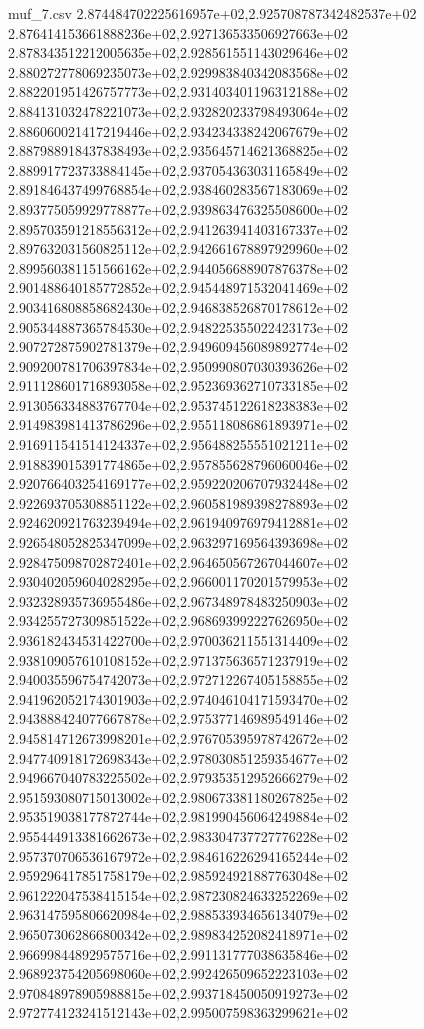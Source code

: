 \begin{filecontents*}{muf_7.csv}
2.874484702225616957e+02,2.925708787342482537e+02
2.876414153661888236e+02,2.927136533506927663e+02
2.878343512212005635e+02,2.928561551143029646e+02
2.880272778069235073e+02,2.929983840342083568e+02
2.882201951426757773e+02,2.931403401196312188e+02
2.884131032478221073e+02,2.932820233798493064e+02
2.886060021417219446e+02,2.934234338242067679e+02
2.887988918437838493e+02,2.935645714621368825e+02
2.889917723733884145e+02,2.937054363031165849e+02
2.891846437499768854e+02,2.938460283567183069e+02
2.893775059929778877e+02,2.939863476325508600e+02
2.895703591218556312e+02,2.941263941403167337e+02
2.897632031560825112e+02,2.942661678897929960e+02
2.899560381151566162e+02,2.944056688907876378e+02
2.901488640185772852e+02,2.945448971532041469e+02
2.903416808858682430e+02,2.946838526870178612e+02
2.905344887365784530e+02,2.948225355022423173e+02
2.907272875902781379e+02,2.949609456089892774e+02
2.909200781706397834e+02,2.950990807030393626e+02
2.911128601716893058e+02,2.952369362710733185e+02
2.913056334883767704e+02,2.953745122618238383e+02
2.914983981413786296e+02,2.955118086861893971e+02
2.916911541514124337e+02,2.956488255551021211e+02
2.918839015391774865e+02,2.957855628796060046e+02
2.920766403254169177e+02,2.959220206707932448e+02
2.922693705308851122e+02,2.960581989398278893e+02
2.924620921763239494e+02,2.961940976979412881e+02
2.926548052825347099e+02,2.963297169564393698e+02
2.928475098702872401e+02,2.964650567267044607e+02
2.930402059604028295e+02,2.966001170201579953e+02
2.932328935736955486e+02,2.967348978483250903e+02
2.934255727309851522e+02,2.968693992227626950e+02
2.936182434531422700e+02,2.970036211551314409e+02
2.938109057610108152e+02,2.971375636571237919e+02
2.940035596754742073e+02,2.972712267405158855e+02
2.941962052174301903e+02,2.974046104171593470e+02
2.943888424077667878e+02,2.975377146989549146e+02
2.945814712673998201e+02,2.976705395978742672e+02
2.947740918172698343e+02,2.978030851259354677e+02
2.949667040783225502e+02,2.979353512952666279e+02
2.951593080715013002e+02,2.980673381180267825e+02
2.953519038177872744e+02,2.981990456064249884e+02
2.955444913381662673e+02,2.983304737727776228e+02
2.957370706536167972e+02,2.984616226294165244e+02
2.959296417851758179e+02,2.985924921887763048e+02
2.961222047538415154e+02,2.987230824633252269e+02
2.963147595806620984e+02,2.988533934656134079e+02
2.965073062866800342e+02,2.989834252082418971e+02
2.966998448929575716e+02,2.991131777038635846e+02
2.968923754205698060e+02,2.992426509652223103e+02
2.970848978905988815e+02,2.993718450050919273e+02
2.972774123241512143e+02,2.995007598363299621e+02

\end{filecontents*}
